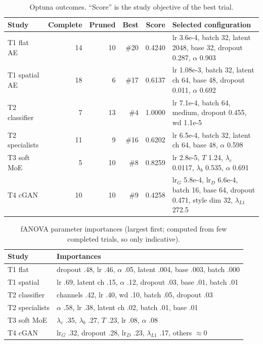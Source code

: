 \documentclass[conference]{IEEEtran}
\begin{document}
\begin{table}[t]
\caption{Optuna outcomes. ``Score'' is the study objective of the best trial.}
\label{tab:optuna}
\centering\footnotesize
\begin{tabular}{@{}lrrrrl@{}}
\toprule
Study & Complete & Pruned & Best & Score & Selected configuration\\
\midrule
T1 flat AE & 14 & 10 & \#20 & 0.4240 & lr 3.6e-4, batch 32, latent 2048, base 32, dropout 0.287, $\alpha$ 0.903\\
T1 spatial AE & 18 & 6 & \#17 & 0.6137 & lr 1.08e-3, batch 32, latent ch 64, base 48, dropout 0.011, $\alpha$ 0.692\\
T2 classifier & 7 & 13 & \#4 & 1.0000 & lr 7.1e-4, batch 64, medium, dropout 0.455, wd 1.1e-5\\
T2 specialists & 11 & 9 & \#16 & 0.6202 & lr 6.5e-4, batch 32, latent ch 64, base 48, $\alpha$ 0.598\\
T3 soft MoE & 5 & 10 & \#8 & 0.8259 & lr 2.8e-5, $T$ 1.24, $\lambda_c$ 0.0117, $\lambda_b$ 0.535, $\alpha$ 0.691\\
T4 cGAN & 10 & 10 & \#9 & 0.4258 & lr$_G$ 5.8e-4, lr$_D$ 6.6e-4, batch 16, base 64, dropout 0.471, style dim 32, $\lambda_{L1}$ 272.5\\
\bottomrule
\end{tabular}
\end{table}

\begin{table}[t]
\caption{fANOVA parameter importances (largest first; computed from few completed trials, so only indicative).}
\label{tab:importance}
\centering\footnotesize
\begin{tabular}{@{}lp{5.6cm}@{}}
\toprule
Study & Importances\\
\midrule
T1 flat & dropout .48, lr .46, $\alpha$ .05, latent .004, base .003, batch .000\\
T1 spatial & lr .69, latent ch .15, $\alpha$ .12, dropout .03, base .01, batch .01\\
T2 classifier & channels .42, lr .40, wd .10, batch .05, dropout .03\\
T2 specialists & $\alpha$ .58, lr .38, latent ch .02, batch .01, base .01\\
T3 soft MoE & $\lambda_c$ .35, $\lambda_b$ .27, $T$ .23, lr .08, $\alpha$ .08\\
T4 cGAN & lr$_G$ .32, dropout .28, lr$_D$ .23, $\lambda_{L1}$ .17, others $\approx$0\\
\bottomrule
\end{tabular}
\end{table}
\end{document}
